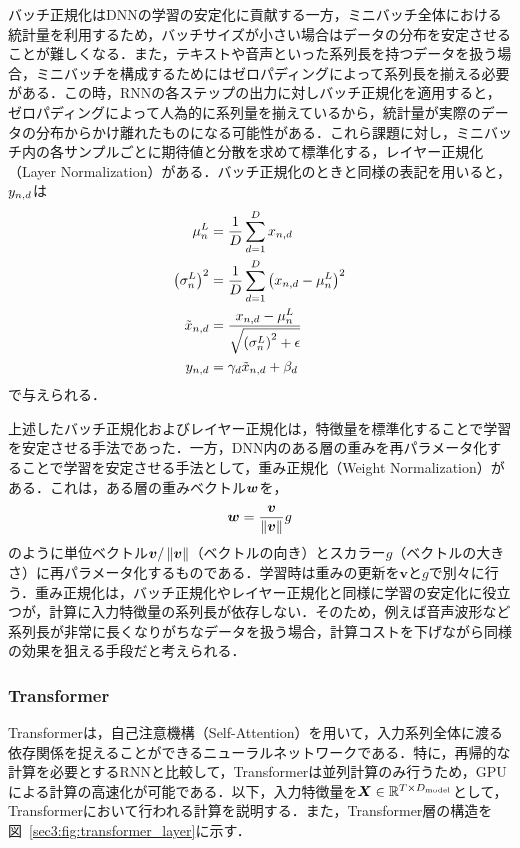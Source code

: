 \documentclass[12pt]{jarticle}
\numberwithin{equation}{section}    %
\numberwithin{figure}{section}      %
\numberwithin{table}{section}      %
\begin{document}
バッチ正規化はDNNの学習の安定化に貢献する一方，ミニバッチ全体における統計量を利用するため，バッチサイズが小さい場合はデータの分布を安定させることが難しくなる．また，テキストや音声といった系列長を持つデータを扱う場合，ミニバッチを構成するためにはゼロパディングによって系列長を揃える必要がある．この時，RNNの各ステップの出力に対しバッチ正規化を適用すると，ゼロパディングによって人為的に系列量を揃えているから，統計量が実際のデータの分布からかけ離れたものになる可能性がある．これら課題に対し，ミニバッチ内の各サンプルごとに期待値と分散を求めて標準化する，レイヤー正規化（Layer Normalization）\cite{ba2016layer}がある．バッチ正規化のときと同様の表記を用いると，$y_{n, d}$は
\begin{align}
    \mu^{L}_{n}                      & = \frac{1}{D} \sum_{d = 1}^{D} x_{n, d}                                  \\
    \left(\sigma^{L}_{n}\right)^{2}              & = \frac{1}{D} \sum_{d = 1}^{D} \left(x_{n, d} - \mu^{L}_{n}\right)^{2} \\
    \tilde{x}_{n, d} & = \frac{x_{n, d} - \mu^{L}_{n}}{\sqrt{\left(\sigma^{L}_{n}\right)^{2} + \epsilon}}       \\
    y_{n, d}        & = \gamma_{d} \tilde{x}_{n, d} +  \beta_{d}
\end{align}
で与えられる．

上述したバッチ正規化およびレイヤー正規化は，特徴量を標準化することで学習を安定させる手法であった．一方，DNN内のある層の重みを再パラメータ化することで学習を安定させる手法として，重み正規化（Weight Normalization）\cite{salimans2016weight}がある．これは，ある層の重みベクトル$\bm{w}$を，
\begin{equation}
    \bm{w} = \frac{\bm{v}}{\left\|\bm{v}\right\|} g
\end{equation}
のように単位ベクトル$\bm{v} / \left\|\bm{v}\right\|$（ベクトルの向き）とスカラー$g$（ベクトルの大きさ）に再パラメータ化するものである．学習時は重みの更新を$\bm{v}$と$g$で別々に行う．重み正規化は，バッチ正規化やレイヤー正規化と同様に学習の安定化に役立つが，計算に入力特徴量の系列長が依存しない．そのため，例えば音声波形など系列長が非常に長くなりがちなデータを扱う場合，計算コストを下げながら同様の効果を狙える手段だと考えられる．

\subsubsection{Transformer}
Transformer\cite{vaswani2017attention}は，自己注意機構（Self-Attention）を用いて，入力系列全体に渡る依存関係を捉えることができるニューラルネットワークである．特に，再帰的な計算を必要とするRNNと比較して，Transformerは並列計算のみ行うため，GPUによる計算の高速化が可能である．以下，入力特徴量を$\bm{X} \in \mathbb{R}^{T \times D_{\text{model}}}$として，Transformerにおいて行われる計算を説明する．また，Transformer層の構造を図~\ref{sec3:fig:transformer_layer}に示す．
\end{document}
